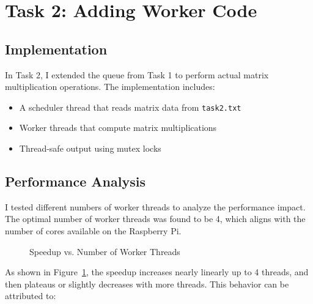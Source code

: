 \documentclass[11pt,a4paper]{article}
\begin{document}
\section{Task 2: Adding Worker Code}

\subsection{Implementation}
In Task 2, I extended the queue from Task 1 to perform actual matrix multiplication operations. The implementation includes:

\begin{itemize}
    \item A scheduler thread that reads matrix data from \texttt{task2.txt}
    \item Worker threads that compute matrix multiplications
    \item Thread-safe output using mutex locks
\end{itemize}

\subsection{Performance Analysis}
I tested different numbers of worker threads to analyze the performance impact. The optimal number of worker threads was found to be 4, which aligns with the number of cores available on the Raspberry Pi.

\begin{figure}[!htb]
\centering
{}
\caption{Speedup vs. Number of Worker Threads}
\label{fig:speedup}
\end{figure}

As shown in Figure~\ref{fig:speedup}, the speedup increases nearly linearly up to 4 threads, and then plateaus or slightly decreases with more threads. This behavior can be attributed to:
\end{document}
